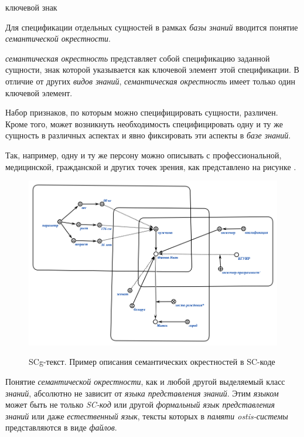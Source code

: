 \begin{SCn}
	\begin{scnrelfromlist}{ключевой знак}
	\end{scnrelfromlist}
\end{SCn}

Для спецификации отдельных сущностей в рамках \textit{базы знаний} вводится понятие \textit{семантической окрестности}. 

\textit{семантическая окрестность} представляет собой спецификацию заданной сущности, знак которой указывается как ключевой элемент этой спецификации. В отличие от других \textit{видов знаний}, \textit{семантическая окрестность} имеет только один ключевой элемент.

Набор признаков, по которым можно специфицировать сущности, различен. Кроме того, может возникнуть необходимость специфицировать одну и ту же сущность в различных аспектах и явно фиксировать эти аспекты в \textit{базе знаний}.

Так, например, одну и ту же персону можно описывать с профессиональной, медицинской, гражданской и других точек зрения, как представлено на рисунке \textit{}. 

\begin{figure}[H]
	\caption{SCg-текст. Пример описания семантических окрестностей в SC-коде}
	\includegraphics[scale=0.7]{author/part2/figures/chapter_kb/semantic_neighborhood.png}
	\label{fig:semantic_neighborhood}
\end{figure}

Понятие \textit{семантической окрестности}, как и любой другой  выделяемый класс \textit{знаний}, абсолютно не зависит от \textit{языка представления знаний}. Этим \textit{языком} может быть не только \textit{SC-код} или другой \textit{формальный язык представления знаний} или даже \textit{естественный язык}, тексты которых в \textit{памяти ostis-системы} представляются в виде \textit{файлов}.

